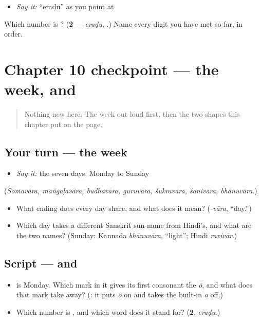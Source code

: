 \begin{itemize}
\raggedright
  \item \emph{Say it:} \textquotedblleft{}eraḍu\textquotedblright{} as you point at 
\end{itemize}

\begin{tcolorbox}[breakable,colback=teal!4,colframe=teal!35!black,title={Before you move on}]
Which number is \textbf{}? (\textbf{2} — \emph{eraḍu}, .) Name every digit you have met so far, in order.
\end{tcolorbox}
\section[Practice]{Chapter 10 checkpoint — the week,  and }

\label{lesson:KA-C10-checkpoint}



\begin{quote}
Nothing new here. The week out loud first, then the two shapes this chapter put on the page.
\end{quote}

\subsection*{Your turn — the week}
\begin{itemize}
\raggedright
  \item \emph{Say it:} the seven days, Monday to Sunday
\end{itemize}

(\emph{Sōmavāra, maṅgaḷavāra, budhavāra, guruvāra, śukravāra, śanivāra, bhānuvāra}.)

\begin{itemize}
\raggedright
  \item What ending does every day share, and what does it mean? (\emph{-vāra}, \textquotedblleft{}day.\textquotedblright{})
  \item Which day takes a different Sanskrit sun-name from Hindi's, and what are the two names? (Sunday: Kannada \emph{bhānuvāra}, \textquotedblleft{}light\textquotedblright{}; Hindi \emph{ravivār}.)
\end{itemize}

\subsection*{Script —  and }
\begin{itemize}
\raggedright
  \item \textbf{} is Monday. Which mark in it gives its first consonant the \emph{ō}, and what does that mark take away? (\textbf{}: it puts \emph{ō} on and takes the built-in \emph{a} off.)
  \item Which number is \textbf{}, and which word does it stand for? (\textbf{2}, \emph{eraḍu}.)
\end{itemize}

